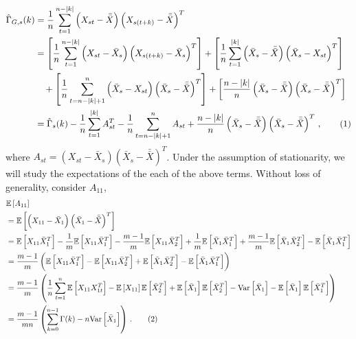 \documentclass[11pt]{article}
\newcommand{\E}{\mathbb{E}}
\newcommand\numberthis{\addtocounter{equation}{1}\tag{\theequation}}
\theoremstyle{remark}
\begin{document}
\begin{align*}
\hat{\Gamma}_{G,s}(k) & = \dfrac{1}{n}\sum_{t=1}^{n-|k|} \left(X_{st} - \bar{\bar{X}} \right) \left(X_{s(t+k)} - \bar{\bar{X}} \right)^T \\
    &= \left[\dfrac{1}{n} \sum_{t=1}^{n-|k|} \left(X_{st} - \bar{X}_s \right) \left(X_{s(t+k)} - \bar{X}_s \right)^T \right] + \left[\dfrac{1}{n} \sum_{t=1}^{|k|} \left(\bar{X}_s - \bar{\bar{X}} \right)  \left(\bar{X}_s - X_{st} \right)^T\right] \\ 
    & \quad +  \left[\dfrac{1}{n} \sum_{t=n-|k|+1}^{n}  \left( \bar{X}_s - X_{st} \right)  \left(\bar{X}_s - \bar{\bar{X}} \right)^T\right] + \left[\dfrac{n-|k|}{n} \left(\bar{X}_s - \bar{\bar{X}}\right)   \left(\bar{X}_s - \bar{\bar{X}} \right)^T\right]\\
    &= \hat{\Gamma}_s(k) - \dfrac{1}{n} \sum_{t=1}^{|k|}A_{st}^T - \dfrac{1}{n}\sum_{t=n-|k|+1}^{n}A_{st} + \dfrac{n-|k|}{n}  \left(\bar{X}_s - \bar{\bar{X}} \right)  \left(\bar{X}_s - \bar{\bar{X}} \right)^T\,, \numberthis \label{eq:acf_breakdown}
\end{align*}
%
where $A_{st} = (X_{st}-\bar{X}_s)(\bar{X}_s - \bar{\bar{X}})^T$. Under the assumption of stationarity, we will study the expectations of the each of the above terms. Without loss of generality, consider $A_{11}$,
\begin{align*}
    &\E \left[A_{11} \right]\\
     &= \mathbb{E} \left[ \left(X_{11} - \bar{X}_1 \right) \left(\bar{X}_1 - \bar{\bar{X}} \right)^T \right]\\
    &= \mathbb{E} \left[X_{11}\bar{X}_1^T \right] - \dfrac{1}{m}\mathbb{E} \left[X_{11}\bar{X}_1^T \right] - \dfrac{m-1}{m}\mathbb{E} \left[X_{11}\bar{X}_2^T \right] + \dfrac{1}{m}\mathbb{E} \left[\bar{X}_1\bar{X}_1^T \right] + \dfrac{m-1}{m}\mathbb{E} \left[\bar{X}_1\bar{X}_2^T \right] - \mathbb{E} \left[\bar{X}_1\bar{X}_1^T \right]\\
    &= \dfrac{m-1}{m}\left(\mathbb{E} \left[X_{11}\bar{X}_1^T \right] - \mathbb{E} \left[X_{11}\bar{X}_2^T \right] + \mathbb{E} \left[\bar{X}_1\bar{X}_2^T \right] - \mathbb{E} \left[\bar{X}_1\bar{X}_1^T \right]\right)\\
    &= \dfrac{m-1}{m}\left(\dfrac{1}{n}\sum_{t=1}^{n}\mathbb{E} \left[X_{11}X_{1t}^T \right] - \mathbb{E}\left[X_{11}\right] \mathbb{E}\left[\bar{X}_2^T \right] + \mathbb{E} \left[\bar{X}_1\right]\mathbb{E}\left[\bar{X}_2^T\right] - \text{Var}\left[\bar{X}_1 \right] - \mathbb{E}\left[\bar{X}_1 \right]\mathbb{E}\left[\bar{X}_1^T \right]\right)\\
    &= \dfrac{m-1}{mn}\left(\sum_{k=0}^{n-1}\Gamma(k) - n\text{Var}\left[\bar{X}_1 \right]\right)\,. \numberthis \label{eq:acf_2}
\end{align*}
\end{document}
